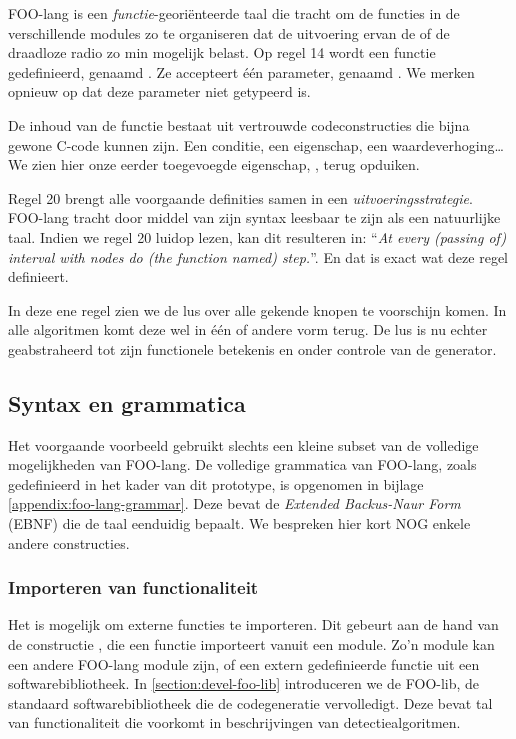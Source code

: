 FOO-lang is een \emph{functie}-geori\"enteerde taal die tracht om de functies
in de verschillende modules zo te organiseren dat de uitvoering ervan de \mcu
of de draadloze radio zo min mogelijk belast. Op regel 14 wordt een functie
gedefinieerd, genaamd . Ze accepteert \'e\'en parameter, genaamd
. We merken opnieuw op dat deze parameter niet getypeerd is.

De inhoud van de functie bestaat uit vertrouwde codeconstructies die bijna
gewone C-code kunnen zijn. Een conditie, een eigenschap, een
waardeverhoging\dots We zien hier onze eerder toegevoegde eigenschap,
, terug opduiken.

Regel 20 brengt alle voorgaande definities samen in een
\emph{uitvoeringsstrategie}. FOO-lang tracht door middel van zijn syntax
leesbaar te zijn als een natuurlijke taal. Indien we regel 20 luidop lezen, kan
dit resulteren in: ``\emph{At every (passing of) interval with nodes do (the
function named) step.}''. En dat is exact wat deze regel definieert.

In deze ene regel zien we de lus over alle gekende knopen te voorschijn komen.
In alle algoritmen komt deze wel in \'e\'en of andere vorm terug. De lus is nu
echter geabstraheerd tot zijn functionele betekenis en onder controle van de
generator.

\subsection{Syntax en grammatica}
\label{subsection:devel-foo-lang-grammar}

Het voorgaande voorbeeld gebruikt slechts een kleine subset van de volledige
mogelijkheden van FOO-lang. De volledige grammatica van FOO-lang, zoals
gedefinieerd in het kader van dit prototype, is opgenomen in bijlage
\ref{appendix:foo-lang-grammar}. Deze bevat de \emph{Extended Backus-Naur Form}
(EBNF) die de taal eenduidig bepaalt. We bespreken hier kort NOG enkele andere
constructies.

\vspace{-3mm}

\subsubsection{Importeren van functionaliteit}

Het is mogelijk om externe functies te importeren. Dit gebeurt aan de hand van
de constructie , die een functie importeert vanuit
een module. Zo'n module kan een andere FOO-lang module zijn, of een extern
gedefinieerde functie uit een softwarebibliotheek. In
\ref{section:devel-foo-lib} introduceren we de FOO-lib, de standaard
softwarebibliotheek die de codegeneratie vervolledigt. Deze bevat tal van
functionaliteit die voorkomt in beschrijvingen van detectiealgoritmen.

